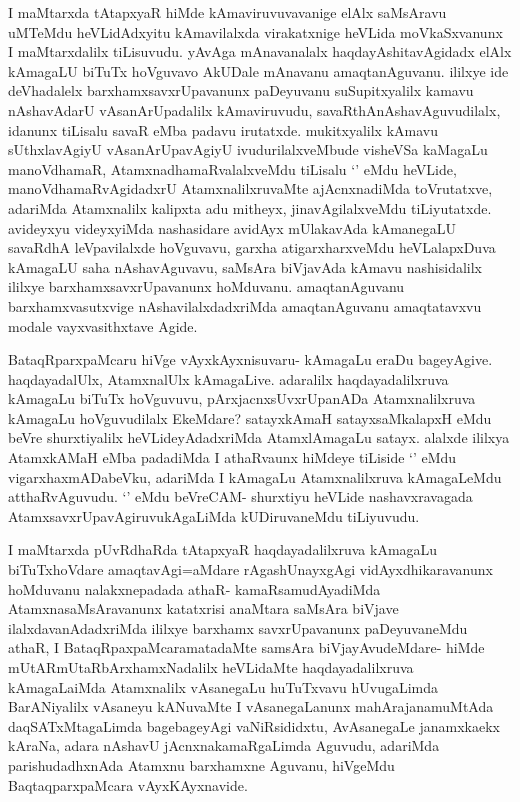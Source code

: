 \begin{artha}
I maMtarxda tAtapxyaR hiMde kAmaviruvuvavanige elAlx saMsAravu uMTeMdu heVLidAdxyitu kAmavilalxda virakatxnige heVLida moVkaSxvanunx I maMtarxdalilx tiLisuvudu. yAvAga mAnavanalalx haqdayAshitavAgidadx elAlx kAmagaLU biTuTx hoVguvavo AkUDale mAnavanu amaqtanAguvanu. ililxye ide deVhadalelx barxhamxsavxrUpavanunx paDeyuvanu suSupitxyalilx kamavu nAshavAdarU vAsanArUpadalilx kAmaviruvudu, savaRthAnAshavAguvudilalx, idanunx tiLisalu savaR eMba padavu irutatxde. mukitxyalilx kAmavu sUthxlavAgiyU vAsanArUpavAgiyU ivudurilalxveMbude visheVSa kaMagaLu manoVdhamaR, AtamxnadhamaRvalalxveMdu tiLisalu `\stext' eMdu heVLide, manoVdhamaRvAgidadxrU AtamxnalilxruvaMte ajAcnxnadiMda toVrutatxve, adariMda Atamxnalilx kalipxta adu mitheyx, jinavAgilalxveMdu tiLiyutatxde. avideyxyu videyxyiMda nashasidare avidAyx mUlakavAda kAmanegaLU savaRdhA leVpavilalxde hoVguvavu, garxha atigarxharxveMdu heVLalapxDuva kAmagaLU saha nAshavAguvavu, saMsAra biVjavAda kAmavu nashisidalilx ililxye barxhamxsavxrUpavanunx hoMduvanu. amaqtanAguvanu barxhamxvasutxvige nAshavilalxdadxriMda amaqtanAguvanu amaqtatavxvu modale vayxvasithxtave Agide.
\end{artha}

\begin{artha}
BataqRparxpaMcaru hiVge vAyxkAyxnisuvaru- kAmagaLu eraDu bageyAgive. haqdayadalUlx, AtamxnalUlx kAmagaLive. adaralilx haqdayadalilxruva kAmagaLu biTuTx hoVguvuvu, pArxjacnxsUvxrUpanADa Atamxnalilxruva kAmagaLu hoVguvudilalx EkeMdare? satayxkAmaH satayxsaMkalapxH eMdu beVre shurxtiyalilx heVLideyAdadxriMda AtamxlAmagaLu satayx. alalxde ililxya AtamxkAMaH eMba padadiMda I athaRvaunx hiMdeye tiLiside `\stext' eMdu vigarxhaxmADabeVku, adariMda I kAmagaLu Atamxnalilxruva kAmagaLeMdu atthaRvAguvudu. `\stext' eMdu beVreCAM- shurxtiyu heVLide nashavxravagada AtamxsavxrUpavAgiruvukAgaLiMda kUDiruvaneMdu tiLiyuvudu.

I maMtarxda pUvRdhaRda tAtapxyaR haqdayadalilxruva kAmagaLu biTuTxhoVdare amaqtavAgi=aMdare rAgashUnayxgAgi vidAyxdhikaravanunx hoMduvanu nalakxnepadada athaR- kamaRsamudAyadiMda AtamxnasaMsAravanunx katatxrisi anaMtara saMsAra biVjave ilalxdavanAdadxriMda ililxye barxhamx savxrUpavanunx paDeyuvaneMdu athaR, I BataqRpaxpaMcaramatadaMte samsAra biVjayAvudeMdare- hiMde mUtARmUtaRbArxhamxNadalilx heVLidaMte haqdayadalilxruva kAmagaLaiMda Atamxnalilx vAsanegaLu huTuTxvavu hUvugaLimda BarANiyalilx vAsaneyu kANuvaMte I vAsanegaLanunx mahArajanamuMtAda daqSATxMtagaLimda bagebageyAgi vaNiRsididxtu, AvAsanegaLe janamxkaekx kAraNa, adara nAshavU jAcnxnakamaRgaLimda Aguvudu, adariMda parishudadhxnAda Atamxnu barxhamxne Aguvanu, hiVgeMdu BaqtaqparxpaMcara vAyxKAyxnavide.
\end{artha}


